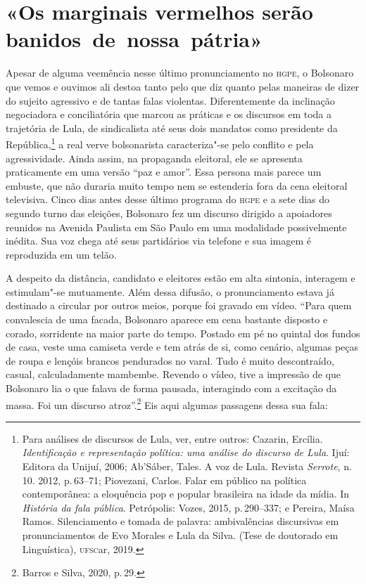 \section{«Os marginais vermelhos serão banidos~de~nossa~pátria»}

Apesar de alguma veemência nesse último pronunciamento no \textsc{hgpe}, o
Bolsonaro que vemos e ouvimos ali destoa tanto pelo que diz quanto pelas
maneiras de dizer do sujeito agressivo e de tantas falas violentas.
Diferentemente da inclinação negociadora e conciliatória que marcou as
práticas e os discursos em toda a trajetória de Lula, de sindicalista
até seus dois mandatos como presidente da República,\footnote{Para
  análises de discursos de Lula, ver, entre outros: Cazarin, Ercília.
  \emph{Identificação e representação política: uma análise do discurso
  de Lula}. Ijuí: Editora da Unijuí, 2006; Ab'Sáber, Tales. A voz de
  Lula. Revista \emph{Serrote}, n. 10. 2012, p.\,63--71; Piovezani,
  Carlos. Falar em público na política contemporânea: a eloquência pop e
  popular brasileira na idade da mídia. In \emph{História da fala
  pública}. Petrópolis: Vozes, 2015, p.\,290--337; e Pereira, Maísa Ramos.
  Silenciamento e tomada de palavra: ambivalências discursivas em
  pronunciamentos de Evo Morales e Lula da Silva. (Tese de doutorado em
  Linguística), \textsc{ufsc}ar, 2019.} a real verve bolsonarista caracteriza"-se
pelo conflito e pela agressividade. Ainda assim, na propaganda
eleitoral, ele se apresenta praticamente em uma versão ``paz e amor''.
Essa persona mais parece um embuste, que não duraria muito tempo nem se
estenderia fora da cena eleitoral televisiva. Cinco dias antes desse
último programa do \textsc{hgpe} e a sete dias do segundo turno das eleições,
Bolsonaro fez um discurso dirigido a apoiadores reunidos na Avenida
Paulista em São Paulo em uma modalidade possivelmente inédita. Sua voz
chega até seus partidários via telefone e sua imagem é reproduzida em um
telão.

A despeito da distância, candidato e eleitores estão em alta sintonia,
interagem e estimulam"-se mutuamente. Além dessa difusão, o
pronunciamento estava já destinado a circular por outros meios, porque
foi gravado em vídeo. ``Para quem convalescia de uma facada, Bolsonaro
aparece em cena bastante disposto e corado, sorridente na maior parte do
tempo. Postado em pé no quintal dos fundos de casa, veste uma camiseta
verde e tem atrás de si, como cenário, algumas peças de roupa e lençóis
brancos pendurados no varal. Tudo é muito descontraído, casual,
calculadamente mambembe. Revendo o vídeo, tive a impressão de que
Bolsonaro lia o que falava de forma pausada, interagindo com a excitação
da massa. Foi um discurso atroz''.\footnote{Barros e Silva, 2020, p.\,29.}
Eis aqui algumas passagens dessa sua fala:


